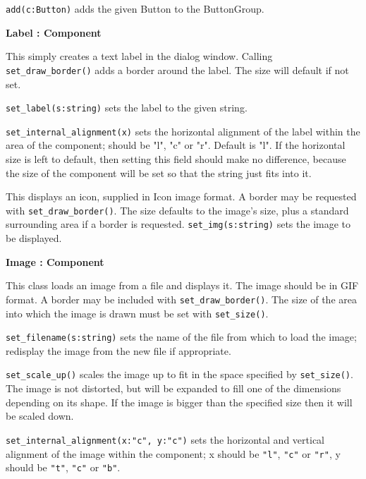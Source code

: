 
\texttt{add(c:Button)} adds the given Button to the ButtonGroup.

{\ttfamily\bfseries
\noindent {}Label : Component}

This simply creates a text label in the dialog window. Calling
\texttt{set\_draw\_border()} adds a border around the label. The size will
default if not set.

\texttt{set\_label(s:string)} sets the label to the given string.

\texttt{set\_internal\_alignment(x)} sets the horizontal alignment of the label
within the area of the component; should be "l", "c" or "r". Default is
"l". If the horizontal size is left to
default, then setting this field should make no difference, because the
size of the component will be set so that the string just fits into it.


This displays an icon, supplied in Icon image format. A border may be
requested with \texttt{set\_draw\_border()}. The size defaults to the
image's size, plus a standard surrounding area if a
border is requested. \texttt{set\_img(s:string)} sets the image to be displayed.

{\ttfamily\bfseries
{}Image : Component}

This class loads an image from a file and displays it. The image should
be in GIF format. A border may be included with \texttt{set\_draw\_border()}.
The size of the area into which the image is drawn must be set with
\texttt{set\_size()}.

\texttt{set\_filename(s:string)} sets the name of the file from which to load
the image; redisplay the image from the new file if appropriate.

\texttt{set\_scale\_up()} scales the image up to fit in the space
specified by \texttt{set\_size()}. The image is not distorted, but will be
expanded to fill one of the dimensions depending on its shape. If the
image is bigger than the specified size then it will be scaled down.

\texttt{set\_internal\_alignment(x:"c", y:"c")} sets the horizontal
and vertical alignment of the image within the component;
x should be \texttt{"l"}, \texttt{"c"} or \texttt{"r"},
y should be \texttt{"t"}, \texttt{"c"} or \texttt{"b"}.

